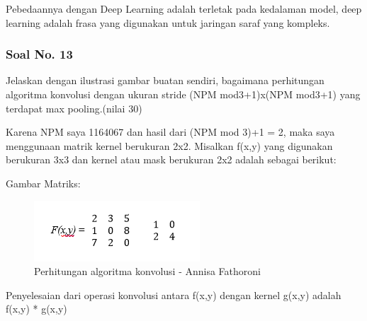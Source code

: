 Pebedaannya dengan Deep Learning adalah terletak pada kedalaman model, deep learning adalah frasa yang digunakan untuk jaringan saraf yang kompleks.

\subsubsection{Soal No. 13}
Jelaskan dengan ilustrasi gambar buatan sendiri, bagaimana perhitungan algoritma konvolusi dengan ukuran stride (NPM mod3+1)x(NPM mod3+1) yang terdapat max pooling.(nilai 30)

Karena NPM saya 1164067 dan hasil dari (NPM mod 3)+1 = 2, maka saya menggunaan matrik kernel berukuran 2x2. Misalkan f(x,y) yang digunakan berukuran 3x3 dan kernel atau mask berukuran 2x2 adalah sebagai berikut:

Gambar Matriks:

\begin{figure}[!hbtp]
\centering
\includegraphics[scale=0.8]{figures/Chapter 7/1164067/Teori/Chapter7AnnisaFathoroni9.png}
\caption{Perhitungan algoritma konvolusi - Annisa Fathoroni}
\label{Perhitungan algoritma konvolusi - Annisa Fathoroni}
\end{figure}

Penyelesaian dari operasi konvolusi antara f(x,y) dengan kernel g(x,y)  adalah f(x,y) *  g(x,y) 

